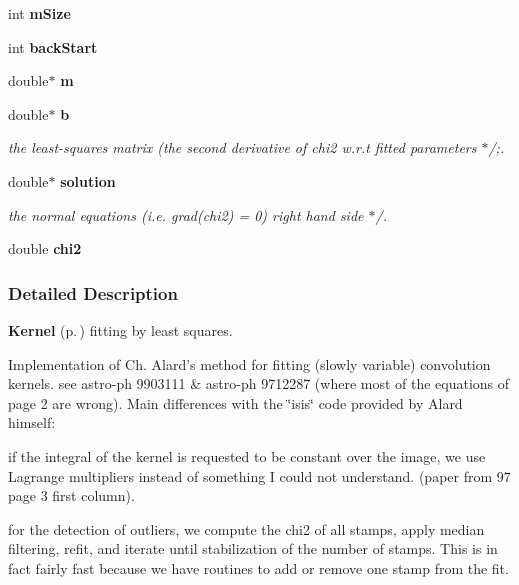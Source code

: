 \begin{CompactItemize}
\item 
{}
int {\bf m\-Size}\label{class_kernelfit_m13}

\item 
{}
int {\bf back\-Start}\label{class_kernelfit_m14}

\item 
{}
double$\ast$ {\bf m}\label{class_kernelfit_m15}

\item 
double$\ast$ {\bf b}
\begin{CompactList}\small\item\em the least-squares matrix (the second derivative of chi2 w.r.t fitted parameters $\ast$/;.\item\end{CompactList}\item 
double$\ast$ {\bf solution}
\begin{CompactList}\small\item\em the normal equations (i.e. grad(chi2) = 0) right hand side $\ast$/.\item\end{CompactList}\item 
{}
double {\bf chi2}\label{class_kernelfit_m18}

\end{CompactItemize}


\subsubsection{Detailed Description}
{\bf Kernel} {\rm (p.\,\pageref{class_kernel})} fitting by least squares.

Implementation of Ch. Alard's method for fitting (slowly variable)  convolution kernels. see astro-ph 9903111 \& astro-ph 9712287  (where most of the equations of page 2 are wrong). Main differences with the \char`\"{}isis\char`\"{} code provided by Alard himself: \begin{CompactItemize}
\item 
 if the integral of the kernel is requested to be constant over the image, we use Lagrange multipliers instead of something I could not understand. (paper from 97 page 3 first column). \item 
 for the detection of outliers, we compute the chi2 of all stamps,  apply median filtering, refit, and iterate until stabilization of the number of stamps. This is in fact fairly fast because we have routines to  add or remove one stamp from the fit. \end{CompactItemize}




